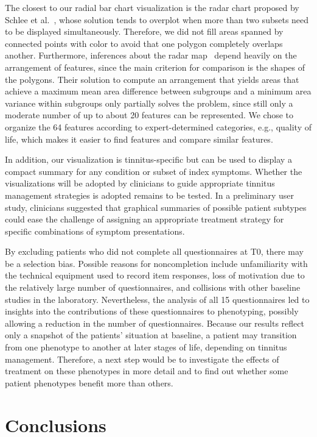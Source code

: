 \documentclass[
  oneside]{book}
\begin{document}
The closest to our radial bar chart visualization is the radar chart proposed by Schlee et al.~\autocite{Schlee:RadarVis2017}, whose solution tends to overplot when more than two subsets need to be displayed simultaneously.
Therefore, we did not fill areas spanned by connected points with color to
avoid that one polygon completely overlaps another.
Furthermore, inferences about the radar map~\autocite{Schlee:RadarVis2017} depend heavily on the arrangement of features, since the main criterion for comparison is the shapes of the polygons.
Their solution to compute an arrangement that yields areas that achieve a maximum mean area difference between subgroups and a minimum area variance within subgroups only partially solves the problem, since still only a moderate number of up to about 20 features can be represented.
We chose to organize the 64 features according to expert-determined categories, e.g., quality of life, which makes it easier to find features and compare similar features.

In addition, our visualization is tinnitus-specific but can be used to display a compact summary for any condition or subset of index symptoms.
Whether the visualizations will be adopted by clinicians to guide appropriate tinnitus management strategies is adopted remains to be tested.
In a preliminary user study, clinicians suggested that graphical summaries of possible patient subtypes could ease the challenge of assigning an appropriate treatment strategy for specific combinations of symptom presentations.

By excluding patients who did not complete all questionnaires at T0, there may be a selection bias.
Possible reasons for noncompletion include unfamiliarity with the technical equipment used to record item responses, loss of motivation due to the relatively large number of questionnaires, and collisions with other baseline studies in the laboratory.
Nevertheless, the analysis of all 15 questionnaires led to insights into the
contributions of these questionnaires to phenotyping, possibly allowing a reduction in the number of questionnaires.
Because our results reflect only a snapshot of the patients' situation at baseline, a patient may transition from one phenotype to another at later stages of life, depending on tinnitus management.
Therefore, a next step would be to investigate the effects of treatment on these phenotypes in more detail and to find out whether some patient phenotypes benefit more than others.

\hypertarget{phenotypes-conclusions}{%
\section{Conclusions}\label{phenotypes-conclusions}}
\end{document}
